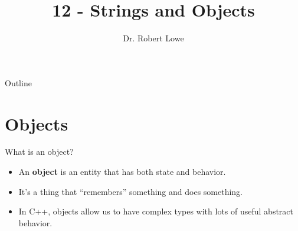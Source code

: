 \documentclass[]{beamer}
\title{12 - Strings and Objects}
\author{Dr. Robert Lowe\\}
\institute[Maryville College] %
{
  Division of Mathematics and Computer Science\\
  Maryville College
}
\date[]{}
\begin{document}
\begin{frame}
  \titlepage
\end{frame}

\begin{frame}{Outline}
  \tableofcontents
\end{frame}





\section{Objects}

\begin{frame}{What is an object?}
    \begin{itemize}[<+(1)->]
        \item An \textbf{object} is an entity that has both state and
            behavior.
        \item It's a thing that ``remembers'' something and does
            something.
        \item In C++, objects allow us to have complex types with lots
            of useful abstract behavior.
    \end{itemize}
\end{frame}
\end{document}
